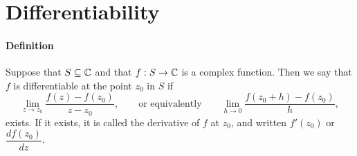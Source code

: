 \section{Differentiability}

\paragraph{Definition}
Suppose that \(S \subseteq \mathbb{C}\) and that \(f: S \to \mathbb{C}\) is a complex function. Then we say that \(f\) is differentiable at the point \(z_0\) in \(S\) if
\[\lim_{z \to z_0} \frac{f(z) - f(z_0)}{z - z_0}, \qquad \text{or equivalently} \qquad \lim_{h \to 0}\frac{f(z_0 + h) - f(z_0)}{h},\]
exists. If it exists, it is called the derivative of \(f\) at \(z_0\), and written \(f'(z_0)\) or \(\dfrac{df(z_0)}{dz}\).